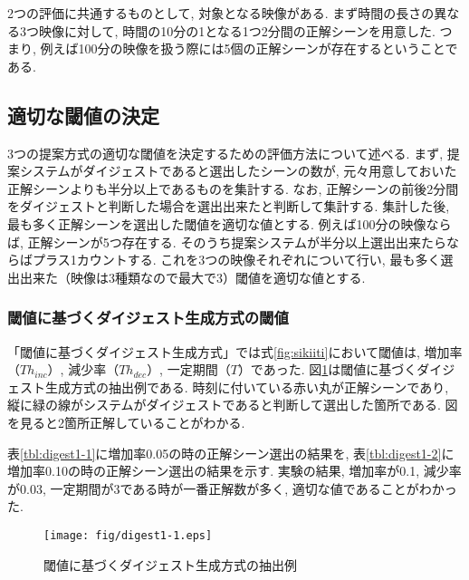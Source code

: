 2つの評価に共通するものとして, 対象となる映像がある. まず時間の長さの異なる3つ映像に対して, 時間の10分の1となる1つ2分間の正解シーンを用意した. つまり, 例えば100分の映像を扱う際には5個の正解シーンが存在するということである.

\subsection{適切な閾値の決定}
3つの提案方式の適切な閾値を決定するための評価方法について述べる. まず, 提案システムがダイジェストであると選出したシーンの数が, 元々用意しておいた正解シーンよりも半分以上であるものを集計する. なお, 正解シーンの前後2分間をダイジェストと判断した場合を選出出来たと判断して集計する. 集計した後, 最も多く正解シーンを選出した閾値を適切な値とする. 例えば100分の映像ならば, 正解シーンが5つ存在する. そのうち提案システムが半分以上選出出来たらならばプラス1カウントする. これを3つの映像それぞれについて行い, 最も多く選出出来た（映像は3種類なので最大で3）閾値を適切な値とする.

\subsubsection{閾値に基づくダイジェスト生成方式の閾値}
「閾値に基づくダイジェスト生成方式」では式\ref{fig:sikiiti}において閾値は, 増加率（$Th_{inc}$）, 減少率（$Th_{dec}$）, 一定期間（$T$）であった. 図\ref{fig:digest1-1}は閾値に基づくダイジェスト生成方式の抽出例である. 時刻に付いている赤い丸が正解シーンであり, 縦に緑の線がシステムがダイジェストであると判断して選出した箇所である. 図を見ると2箇所正解していることがわかる.

表\ref{tbl:digest1-1}に増加率0.05の時の正解シーン選出の結果を, 表\ref{tbl:digest1-2}に増加率0.10の時の正解シーン選出の結果を示す. 実験の結果, 増加率が0.1, 減少率が0.03, 一定期間が3である時が一番正解数が多く, 適切な値であることがわかった.

\begin{figure}[h]
  \centering
  \texttt{[image: fig/digest1-1.eps]}
  \caption{閾値に基づくダイジェスト生成方式の抽出例}
  \label{fig:digest1-1}
\end{figure}

